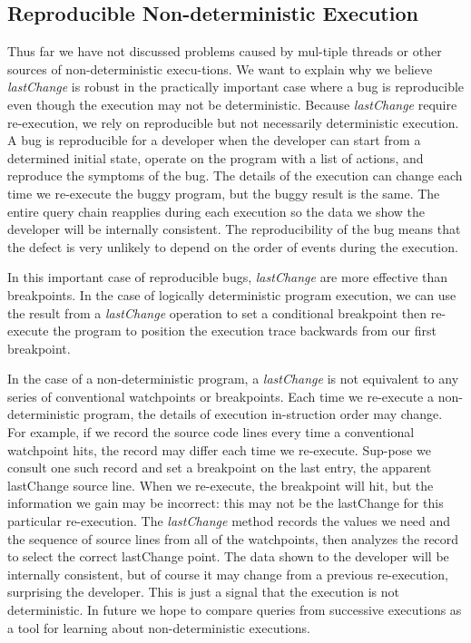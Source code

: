 \documentclass[preprint]{sigplanconf}
\begin{document}
\subsection{Reproducible Non-deterministic Execution}
Thus far we have not discussed problems caused by mul-tiple threads or other sources of non-deterministic execu-tions. We want to explain why we believe \textit{lastChange} is robust in the practically important case where a bug is reproducible even though the execution may not be deterministic. 
Because \textit{lastChange} require re-execution, we rely on reproducible but not necessarily deterministic execution. A bug is reproducible for a developer when the developer can start from a determined initial state, operate on the program with a list of actions, and reproduce the symptoms of the bug. The details of the execution can change each time we re-execute the buggy program, but the buggy result is the same. The entire query chain reapplies during each execution so the data we show the developer will be internally consistent. The reproducibility of the bug means that the defect is very unlikely to depend on the order of events during the execution.

In this important case of reproducible bugs, \textit{lastChange} are more effective than breakpoints. In the case of logically deterministic program execution, we can use the result from a \textit{lastChange} operation to set a conditional breakpoint then re-execute the program to position the execution trace backwards from our first breakpoint. %

In the case of a non-deterministic program, a \textit{lastChange} is not equivalent to any series of conventional watchpoints or breakpoints. Each time we re-execute a non-deterministic program, the details of execution in-struction order may change. For example, if we record the source code lines every time a conventional watchpoint hits, the record may differ each time we re-execute. Sup-pose we consult one such record and set a breakpoint on the last entry, the apparent lastChange source line. When we re-execute, the breakpoint will hit, but the information we gain may be incorrect: this may not be the lastChange for this particular re-execution. The \textit{lastChange} method records the values we need and the sequence of source lines from all of the watchpoints, then analyzes the record to select the correct lastChange point. The data shown to the developer will be internally consistent, but of course it may change from a previous re-execution, surprising the developer. This is just a signal that the execution is not deterministic. In future we hope to compare queries from successive executions as a tool for learning about non-deterministic executions.
\end{document}

